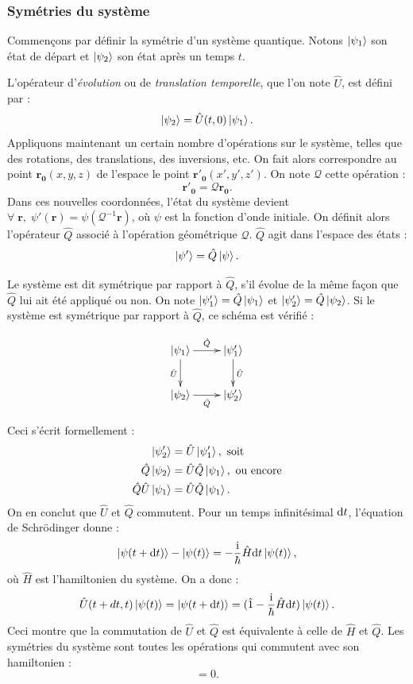 \subsubsection{Symétries du système}
Commençons par définir la symétrie d'un système quantique. Notons $\ket{\psi_1}$ son état de départ et $\ket{\psi_2}$ son état après un temps $t$. \par
L'opérateur d'\textit{évolution} ou de \textit{translation temporelle}, que l'on note $\hat{U}$, est défini par :
\begin{equation}
\ket{\psi_2}=\hat{U}(t,0)\ket{\psi_1}.
\end{equation}
Appliquons maintenant un certain nombre d'opérations sur le système, telles que des rotations, des translations, des inversions, etc. On fait alors correspondre au point $\bm{r_0}(x,y,z)$ de l'espace le point $\bm{r'_0}(x',y',z')$. On note $\mathcal{Q}$ cette opération :
\[  \bm{r'_0} = \mathcal{Q} \bm{r_0}.\]
Dans ces nouvelles coordonnées, l'état du système devient $\forall\;\bm{r},\;\psi'(\bm{r}) = \psi(\mathcal{Q}^{-1}\bm{r})$, où $\psi$ est la fonction d'onde initiale. On définit alors l'opérateur $\hat{Q}$ associé à l'opération géométrique $\mathcal{Q}$. $\hat{Q}$ agit dans l'espace des états : 
\[\ket{\psi'} = \hat{Q}\ket{\psi}.\]

Le système est dit symétrique par rapport à $\hat{Q}$, s'il évolue de la même façon que $\hat{Q}$ lui ait été appliqué ou non. On note $\ket{\psi'_1}=\hat{Q}\ket{\psi_1}$ et $\ket{\psi'_2}=\hat{Q}\ket{\psi_2}$. Si le système est symétrique par rapport à $\hat{Q}$, ce schéma est vérifié :

\begin{displaymath}
    \xymatrix{
        \ket{\psi_1} \ar[r]^{\hat{Q}} \ar[d]_{\hat{U}} & \ket{\psi'_1} \ar[d]^{\hat{U}} \\
        \ket{\psi_2} \ar[r]_{\hat{Q}}       & \ket{\psi'_2} }
\end{displaymath}

Ceci s'écrit formellement :
\begin{align}
\ket{\psi'_2}&=\hat{U}\ket{\psi'_1}, \mbox{ soit}\\
\hat{Q}\ket{\psi_2}&=\hat{U}\hat{Q}\ket{\psi_1}, \mbox{ ou encore}\\
\hat{Q}\hat{U}\ket{\psi_1}&=\hat{U}\hat{Q}\ket{\psi_1}.
\end{align}
On en conclut que $\hat{U}$ et $\hat{Q}$ commutent. Pour un temps infinitésimal $\mathrm{d} t$, l'équation de Schrödinger donne :
\begin{equation}
\ket{\psi(t+\mathrm{d} t)}-\ket{\psi(t)} = -\frac{\mathrm{i}}{\hbar} \hat{H}\mathrm{d} t\ket{\psi(t)},
\end{equation}
où $\hat{H}$ est l'hamiltonien du système. On a donc :
\begin{equation}
\hat{U}(t+dt,t)\ket{\psi(t)} = \ket{\psi(t+\mathrm{d} t)} = (\hat{1}-\frac{\mathrm{i}}{\hbar} \hat{H}\mathrm{d} t)\ket{\psi(t)}.
\end{equation}
Ceci montre que la commutation de $\hat{U}$ et $\hat{Q}$ est équivalente à celle de $\hat{H}$ et $\hat{Q}$. Les symétries du système sont toutes les opérations qui commutent avec son hamiltonien :
\begin{equation}
[\hat{H},\hat{Q}]=0.
\end{equation}



